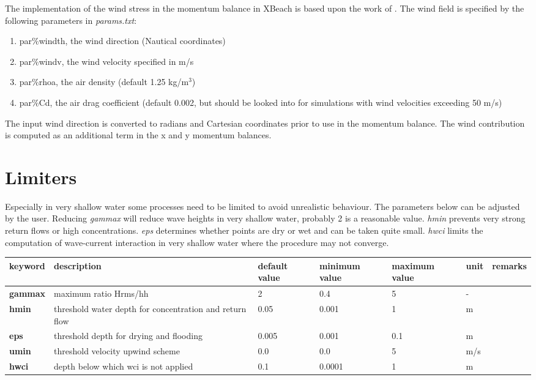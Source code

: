 The implementation of the wind stress in the momentum balance in XBeach is based upon the work of \citet{Ruessink2001}.  The wind field is specified by the following parameters in \textit{params.txt}:

\begin{enumerate}
\item  par\%windth, the wind direction (Nautical coordinates)

\item  par\%windv, the wind velocity specified in m/s

\item  par\%rhoa, the air density (default 1.25 kg/m${}^{3}$)

\item  par\%Cd, the air drag coefficient (default 0.002, but should be looked into for simulations with wind velocities exceeding 50 m/s)
\end{enumerate}

The input wind direction is converted to radians and Cartesian coordinates prior to use in the momentum balance. The wind contribution is computed as an additional term in the x and y momentum balances.


\section{Limiters}

Especially in very shallow water some processes need to be limited to avoid unrealistic behaviour. The parameters below can be adjusted by the user. Reducing \textit{gammax} will reduce wave heights in very shallow water, probably 2 is a reasonable value. \textit{hmin} prevents very strong return flows or high concentrations. \textit{eps} determines whether points are dry or wet and can be taken quite small. \textit{hwci} limits the computation of wave-current interaction in very shallow water where the procedure may not converge.

\begin{tabular}{|p{0.5in}|p{0.9in}|p{0.4in}|p{0.5in}|p{0.5in}|p{0.3in}|p{0.6in}|} \hline 
keyword & description & default value & minimum value & maximum value & unit & remarks \\ \hline 
\textbf{gammax} & maximum ratio Hrms/hh & 2 & 0.4 & 5 & - &  \\ \hline 
\textbf{hmin  } & threshold water depth for concentration and return flow & 0.05 & 0.001 & 1 & m &  \\ \hline 
\textbf{eps     } & threshold depth for drying and flooding & 0.005 & 0.001 & 0.1 & m &  \\ \hline 
\textbf{umin    } & threshold velocity upwind scheme & 0.0 & 0.0 & 5 & m/s &  \\ \hline 
\textbf{hwci} & depth below which wci is not applied & 0.1 & 0.0001 & 1 & m &  \\ \hline 
\end{tabular}
